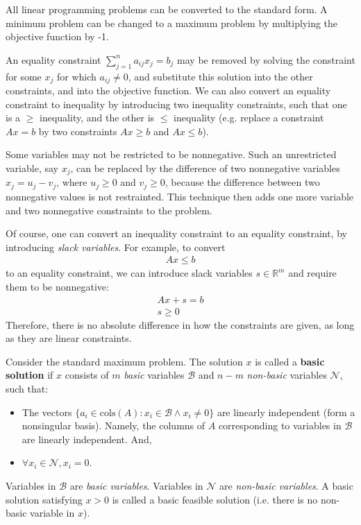 \documentclass[12pt]{article}
\begin{document}
All linear programming problems can be converted to the standard form. A minimum problem can be changed to a maximum problem by multiplying the objective function by -1.

An equality constraint $\sum_{j=1}^na_{ij}x_j=b_j$ may be removed by solving the constraint for some $x_j$ for which $a_{ij}\neq 0$, and substitute this solution into the other constraints, and into the objective function. We can also convert an equality constraint to inequality by introducing two inequality constraints, such that one is a $\geq$ inequality, and the other is $\leq$ inequality (e.g. replace a constraint $Ax=b$ by two constraints $Ax\geq b$ and $Ax \leq b$).

Some variables may not be restricted to be nonnegative. Such an unrestricted variable, say $x_j$, can be replaced by the difference of two nonnegative variables $x_j=u_j-v_j$, where $u_j\geq 0$ and $v_j\geq 0$, because the difference between two nonnegative values is not restrainted. This technique then adds one more variable and two nonnegative constraints to the problem.

Of course, one can convert an inequality constraint to an equality constraint, by introducing \emph{slack variables}. For example, to convert
\begin{align}
  Ax\leq b
\end{align}
to an equality constraint, we can introduce slack variables $s\in\mathbb{R}^m$ and require them to be nonnegative:
\begin{align}
  Ax + s = b\\
  s \geq 0
\end{align}
Therefore, there is no absolute difference in how the constraints are given, as long as they are linear constraints.

Consider the standard maximum problem. The solution $x$ is called a \textbf{basic solution} if
$x$ consists of $m$ \emph{basic} variables $\mathcal{B}$ and $n-m$ \emph{non-basic} variables $\mathcal{N}$, such that:
\begin{itemize}
\item The vectors $\{a_i\in \text{cols}(A):x_i\in\mathcal{B} \land x_i\neq 0\}$ are linearly independent (form a nonsingular basis). Namely, the columns of $A$ corresponding to variables in $\mathcal{B}$ are linearly independent. And,
\item $\forall x_i\in\mathcal{N}, x_i=0$.
\end{itemize}
Variables in $\mathcal{B}$ are \emph{basic variables}. Variables in $\mathcal{N}$ are \emph{non-basic variables}. A basic solution satisfying $x>0$ is called a basic feasible solution (i.e. there is no non-basic variable in $x$).
\end{document}
